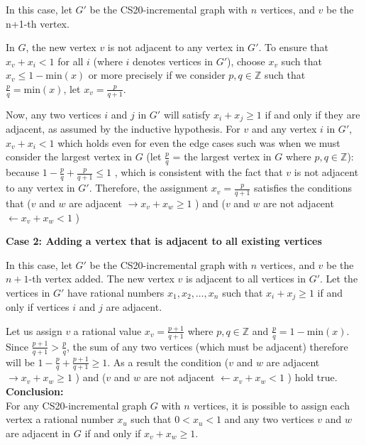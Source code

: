 \documentclass[solution,letterpaper]{cs20}
\begin{document}
\begin{problem}
\begin{solution}
            In this case, let \( G' \) be the CS20-incremental graph with \( n \) vertices, and \( v \) be the n+1-th vertex.

            In \( G \), the new vertex \( v \) is not adjacent to any vertex in \( G' \). To ensure that \( x_v + x_i < 1 \) for all \( i \) (where \( i \) denotes vertices in \( G' \)), choose \( x_v \) such that \(x_v \leq 1 - \text{min}(x)\) or more precisely if we consider $p, q \in \mathbb{Z}$ such that $\frac{p}{q} = \text{min}(x)$, let $x_v = \frac{p}{q + 1}$.

            Now, any two vertices \( i \) and \( j \) in \( G' \) will satisfy \( x_i + x_j \geq 1 \) if and only if they are adjacent, as assumed by the inductive hypothesis. For \( v \) and any vertex \( i \) in \( G' \), \( x_v + x_i < 1\) which holds even for even the edge cases such was when we must consider the largest vertex in $G$ (let $\frac{p}{q}$ = the largest vertex in $G$ where $p,q \in \mathbb{Z}$): because $1 - \frac{p}{q} + \frac{p}{q + 1} \leq 1$ , which is consistent with the fact that \( v \) is not adjacent to any vertex in \( G' \).
            Therefore, the assignment \( x_v = \frac{p}{q+1} \) satisfies the conditions that ($v$ and $w$ are adjacent $\to x_v + x_w \geq 1$ ) and ($v$ and $w$ are not adjacent $\leftarrow x_v + x_w < 1$ )

            \textbf{Case 2: Adding a vertex that is adjacent to all existing vertices}

            In this case, let \( G' \) be the CS20-incremental graph with \( n \) vertices, and \( v \) be the \( n+1 \)-th vertex added. The new vertex \( v \) is adjacent to all vertices in \( G' \). Let the vertices in \( G' \) have rational numbers \( x_1, x_2, \ldots, x_n \) such that \( x_i + x_j \geq 1 \) if and only if vertices \( i \) and \( j \) are adjacent.

            Let us assign $v$ a rational value $x_v = \frac{p+1}{q+1}$ where $p,q \in \mathbb{Z}$ and $\frac{p}{q} = 1 - \text{min}(x)$. Since $\frac{p+1}{q+1} > \frac{p}{q}$, the sum of any two vertices (which must be adjacent) therefore will be $1 - \frac{p}{q} + \frac{p+1}{q+1} \geq 1$. As a result the condition  ($v$ and $w$ are adjacent $\to x_v + x_w \geq 1$ ) and ($v$ and $w$ are not adjacent $\leftarrow x_v + x_w < 1$ ) hold true.\\
            \textbf{Conclusion:} \\
            For any CS20-incremental graph \( G \) with \( n \) vertices, it is possible to assign each vertex a rational number \( x_u \) such that \( 0 < x_u < 1 \) and any two vertices \( v \) and \( w \) are adjacent in \( G \) if and only if \( x_v + x_w \geq 1 \).
        \end{solution}
    \end{problem}
    \newpage
\end{document}
